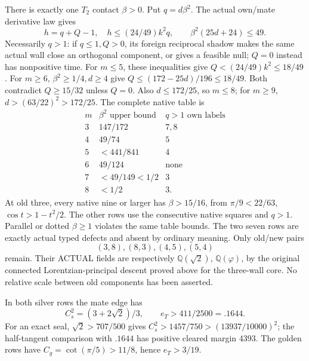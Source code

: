 There is exactly one \(T_2\) contact
\(\beta>0\).
Put \(q=d\beta^2\).
The actual own/mate derivative law gives
\[
 h=q+Q-1,\quad h\le(24/49)k^2q,\qquad
                         \beta^2(25d+24)\le49 .
\]
Necessarily \(q>1\): if \(q\le1,Q>0\),
its foreign reciprocal shadow makes the
same actual wall close an orthogonal
component, or gives a feasible null;
\(Q=0\) instead has nonpositive time.
For \(m\le5\), these inequalities give
\(Q<(24/49)k^2\le18/49\).
For \(m\ge6\), \(\beta^2\ge1/4,d\ge4\)
give \(Q\le(172-25d)/196\le18/49\).
Both contradict \(Q\ge15/32\) unless
\(Q=0\).
Also \(d\le172/25\), so \(m\le8\);
for \(m\ge9\),
\(d>(63/22)^2>172/25\).
The complete native table is
\[
 \begin{array}{c|c|c}
 m&\beta^2\text{ upper bound}&q>1\text{ own labels}\\ \hline
 3&147/172&7,8\\
 4&49/74&5\\
 5&<441/841&4\\
 6&49/124&\text{none}\\
 7&<49/149<1/2&3\\
 8&<1/2&3 .
 \end{array}
\]
At old three, every native nine or larger
has \(\beta>15/16\), from
\(\pi/9<22/63\), \(\cos t>1-t^2/2\).
The other rows use the consecutive native
squares and \(q>1\).
Parallel or dotted \(\beta\ge1\) violates
the same table bounds.
The two seven rows are exactly actual
typed defects and absent by ordinary meaning.
Only old/new pairs
\[
                    (3,8),(8,3),(4,5),(5,4)
\]
remain.
Their ACTUAL fields are respectively
\(\mathbb Q(\sqrt2)\), \(\mathbb Q(\varphi)\),
by the original connected Lorentzian-principal
descent proved above for the three-wall core.
No relative scale between old components
has been asserted.

In both silver rows the mate edge has
\[
 C_s^2=(3+2\sqrt2)/3,\qquad e_T>411/2500=.1644 .
\]
For an exact seal, \(\sqrt2>707/500\)
gives \(C_s^2>1457/750>(13937/10000)^2\);
the half-tangent comparison with \(.1644\)
has positive cleared margin \(4393\).
The golden rows have
\(C_g=\cot(\pi/5)>11/8\), hence
\(e_T>3/19\).

